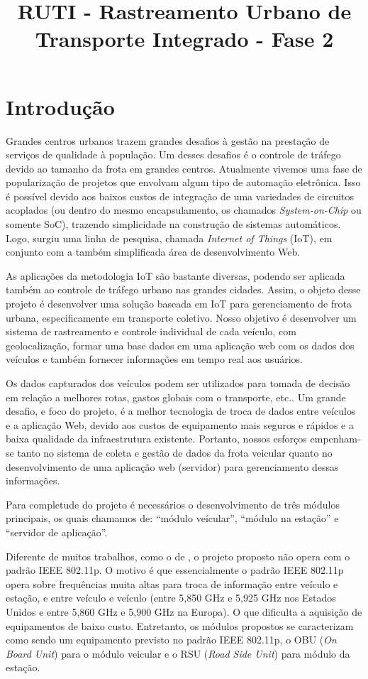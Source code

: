 \documentclass[12pt,cor2018]{uftpibic}
\title{RUTI - Rastreamento Urbano de Transporte Integrado - Fase 2}
\author{}{}
\begin{document}
\maketitle

\chapter{Introdução}

Grandes centros urbanos trazem grandes desafios à gestão na prestação de serviços de qualidade à população. Um desses desafios é o controle de tráfego devido ao tamanho da frota em grandes centros. Atualmente vivemos uma fase de popularização de projetos que envolvam algum tipo de automação eletrônica. Isso é possível devido aos baixos custos de integração de uma variedades de circuitos acoplados (ou dentro do mesmo encapsulamento, os chamados \textit{System-on-Chip} ou somente SoC), trazendo simplicidade na construção de sistemas automáticos. Logo, surgiu uma linha de pesquisa, chamada \textit{Internet of Things} (IoT), em conjunto com a também simplificada área de desenvolvimento Web. 

As aplicações da metodologia IoT são bastante diversas, podendo ser aplicada também ao controle de tráfego urbano nas grandes cidades. Assim, o objeto desse projeto é desenvolver uma solução baseada em IoT para gerenciamento de frota urbana, especificamente em transporte coletivo. Nosso objetivo é desenvolver um sistema de rastreamento e controle individual de cada veículo, com geolocalização, formar uma base dados em uma aplicação web com os dados dos veículos e também fornecer informações em tempo real aos usuários. 

Os dados capturados dos veículos podem ser utilizados para tomada de decisão em relação a melhores rotas, gastos globais com o transporte, etc.. Um grande desafio, e foco do projeto, é a melhor tecnologia de troca de dados entre veículos e a aplicação Web, devido aos custos de equipamento mais seguros e rápidos e a baixa qualidade da infraestrutura existente. Portanto, nossos esforços empenham-se tanto no sistema de coleta e gestão de dados da frota veicular quanto no desenvolvimento de uma aplicação web (servidor) para gerenciamento dessas informações.

Para completude do projeto é necessários o desenvolvimento de três módulos principais, os quais chamamos de: ``módulo veícular'', ``módulo na estação'' e ``servidor de aplicação''.

Diferente de muitos trabalhos, como o de , o projeto proposto não opera com o padrão IEEE 802.11p. O motivo é que essencialmente o padrão IEEE 802.11p opera sobre frequências muita altas para troca de informação entre veículo e estação, e entre veículo e veículo (entre 5,850 GHz e 5,925 GHz nos Estados Unidos e entre 5,860 GHz e 5,900 GHz na Europa). O que dificulta a aquisição de equipamentos de baixo custo. Entretanto, os módulos propostos se caracterizam como sendo um equipamento previsto no padrão IEEE 802.11p, o OBU (\textit{On Board Unit}) para o módulo veicular e o RSU (\textit{Road Side Unit}) para módulo da estação.
\end{document}
